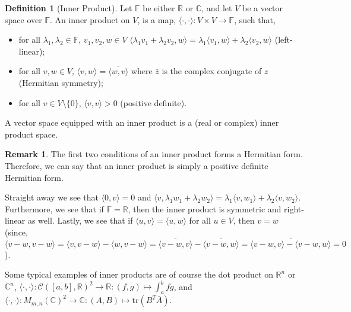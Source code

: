 \documentclass[
]{article}
\theoremstyle{definition}
\newtheorem*{remark}{Remark}
\theoremstyle{definition}
\newtheorem{definition}{Definition}[section]
\begin{document}
\begin{definition}[Inner Product]
  Let \(\mathbb{F}\) be either \(\mathbb{R}\) or \(\mathbb{C}\), and let 
  \(V\) be a vector space over \(\mathbb{F}\). An inner product on \(V\), is 
  a map, \(\langle \cdot, \cdot \rangle : V \times V \to \mathbb{F}\), such 
  that,
  \begin{itemize}
    \item for all \(\lambda_1, \lambda_2 \in \mathbb{F}\), \(v_1, v_2, w \in V\)
      \(\langle \lambda_1 v_1 + \lambda_2 v_2, w \rangle 
      = \lambda_1 \langle v_1, w \rangle + \lambda_2 \langle v_2, w \rangle\) (left-linear);
    \item for all \(v, w \in V\), \(\langle v, w \rangle = \overline{\langle w, v \rangle}\) 
      where \(\bar{z}\) is the complex conjugate of \(z\) (Hermitian symmetry);
    \item for all \(v \in V\setminus\{0\}\), \(\langle v, v \rangle > 0\) 
      (positive definite).
  \end{itemize}
  A vector space equipped with an inner product is a (real or complex) 
  inner product space.
\end{definition}

\begin{remark}
  The first two conditions of an inner product forms a Hermitian form. Therefore, 
  we can say that an inner product is simply a positive definite Hermitian form.
\end{remark}

Straight away we see that \(\langle 0, v \rangle = 0\) and
\(\langle v, \lambda_1 w_1 + \lambda_2 w_2 \rangle = \overline{\lambda_1} \langle v, w_1 \rangle + \overline{\lambda_2} \langle v, w_2 \rangle\).
Furthermore, we see that if \(\mathbb{F} = \mathbb{R}\), then the inner
product is symmetric and right-linear as well. Lastly, we see that if
\(\langle u, v \rangle = \langle u, w \rangle\) for all \(u \in V\),
then \(v = w\) (since,
\(\langle v - w, v - w \rangle = \langle v, v - w \rangle - \langle w, v - w \rangle = \overline{\langle v - w, v \rangle} - \overline{\langle v - w, w \rangle} = \overline{\langle v - w, v \rangle - \langle v - w, w \rangle} = 0\)).

Some typical examples of inner products are of course the dot product on
\(\mathbb{R}^n\) or \(\mathbb{C}^n\),
\(\langle \cdot, \cdot \rangle : \mathcal{C}([a, b], \mathbb{R})^2 \to \mathbb{R} : (f, g) \mapsto \int_a^b fg\),
and
\(\langle \cdot, \cdot \rangle : M_{m, n}(\mathbb{C})^2 \to \mathbb{C} : (A, B) \mapsto \text{tr}(B^T \bar{A})\).
\end{document}
